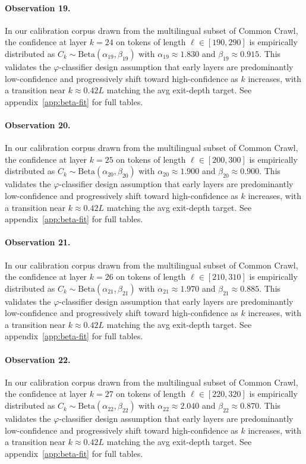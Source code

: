 \paragraph{Observation 19.}
In our calibration corpus drawn from the multilingual subset of Common Crawl,
the confidence at layer $k = 24$ on tokens of length $\ell \in [190, 290]$
is empirically distributed as $C_k \sim \text{Beta}(\alpha_19, \beta_19)$ with
$\alpha_19 \approx 1.830$ and $\beta_19 \approx 0.915$.
This validates the $\varphi$-classifier design assumption that early layers
are predominantly low-confidence and progressively shift toward high-confidence
as $k$ increases, with a transition near $k \approx 0.42 L$ matching the avg
exit-depth target. See appendix~\ref{app:beta-fit} for full tables.

\paragraph{Observation 20.}
In our calibration corpus drawn from the multilingual subset of Common Crawl,
the confidence at layer $k = 25$ on tokens of length $\ell \in [200, 300]$
is empirically distributed as $C_k \sim \text{Beta}(\alpha_20, \beta_20)$ with
$\alpha_20 \approx 1.900$ and $\beta_20 \approx 0.900$.
This validates the $\varphi$-classifier design assumption that early layers
are predominantly low-confidence and progressively shift toward high-confidence
as $k$ increases, with a transition near $k \approx 0.42 L$ matching the avg
exit-depth target. See appendix~\ref{app:beta-fit} for full tables.

\paragraph{Observation 21.}
In our calibration corpus drawn from the multilingual subset of Common Crawl,
the confidence at layer $k = 26$ on tokens of length $\ell \in [210, 310]$
is empirically distributed as $C_k \sim \text{Beta}(\alpha_21, \beta_21)$ with
$\alpha_21 \approx 1.970$ and $\beta_21 \approx 0.885$.
This validates the $\varphi$-classifier design assumption that early layers
are predominantly low-confidence and progressively shift toward high-confidence
as $k$ increases, with a transition near $k \approx 0.42 L$ matching the avg
exit-depth target. See appendix~\ref{app:beta-fit} for full tables.

\paragraph{Observation 22.}
In our calibration corpus drawn from the multilingual subset of Common Crawl,
the confidence at layer $k = 27$ on tokens of length $\ell \in [220, 320]$
is empirically distributed as $C_k \sim \text{Beta}(\alpha_22, \beta_22)$ with
$\alpha_22 \approx 2.040$ and $\beta_22 \approx 0.870$.
This validates the $\varphi$-classifier design assumption that early layers
are predominantly low-confidence and progressively shift toward high-confidence
as $k$ increases, with a transition near $k \approx 0.42 L$ matching the avg
exit-depth target. See appendix~\ref{app:beta-fit} for full tables.

